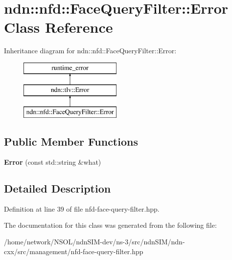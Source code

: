 \hypertarget{classndn_1_1nfd_1_1FaceQueryFilter_1_1Error}{}\section{ndn\+:\+:nfd\+:\+:Face\+Query\+Filter\+:\+:Error Class Reference}
\label{classndn_1_1nfd_1_1FaceQueryFilter_1_1Error}
Inheritance diagram for ndn\+:\+:nfd\+:\+:Face\+Query\+Filter\+:\+:Error\+:\begin{figure}[H]
\begin{center}
\leavevmode
\includegraphics[height=3.000000cm]{classndn_1_1nfd_1_1FaceQueryFilter_1_1Error}
\end{center}
\end{figure}
\subsection*{Public Member Functions}
\begin{DoxyCompactItemize}
\item 
{\bfseries Error} (const std\+::string \&what)\hypertarget{classndn_1_1nfd_1_1FaceQueryFilter_1_1Error_af640acea9d61ae7a37ab41a50147d553}{}\label{classndn_1_1nfd_1_1FaceQueryFilter_1_1Error_af640acea9d61ae7a37ab41a50147d553}

\end{DoxyCompactItemize}


\subsection{Detailed Description}


Definition at line 39 of file nfd-\/face-\/query-\/filter.\+hpp.



The documentation for this class was generated from the following file\+:\begin{DoxyCompactItemize}
\item 
/home/network/\+N\+S\+O\+L/ndn\+S\+I\+M-\/dev/ns-\/3/src/ndn\+S\+I\+M/ndn-\/cxx/src/management/nfd-\/face-\/query-\/filter.\+hpp\end{DoxyCompactItemize}
